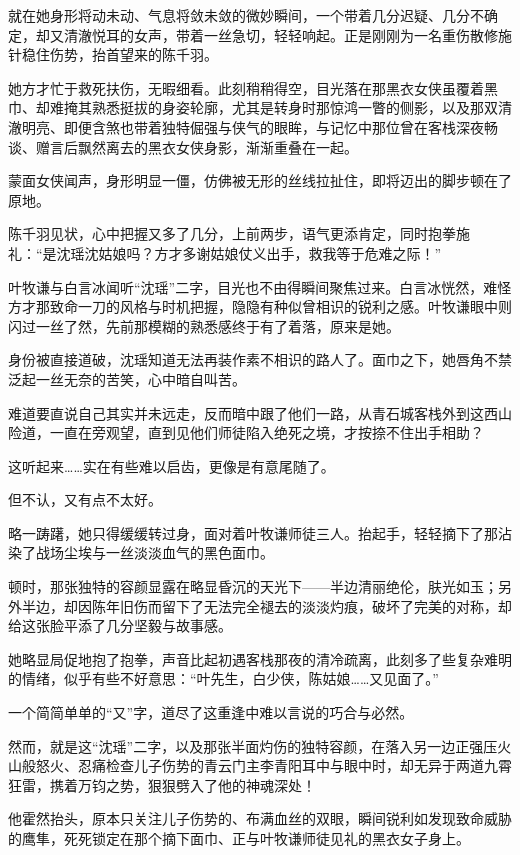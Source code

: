 \vspace{2em}

就在她身形将动未动、气息将敛未敛的微妙瞬间，一个带着几分迟疑、几分不确定，却又清澈悦耳的女声，带着一丝急切，轻轻响起。正是刚刚为一名重伤散修施针稳住伤势，抬首望来的陈千羽。

她方才忙于救死扶伤，无暇细看。此刻稍稍得空，目光落在那黑衣女侠虽覆着黑巾、却难掩其熟悉挺拔的身姿轮廓，尤其是转身时那惊鸿一瞥的侧影，以及那双清澈明亮、即便含煞也带着独特倔强与侠气的眼眸，与记忆中那位曾在客栈深夜畅谈、赠言后飘然离去的黑衣女侠身影，渐渐重叠在一起。

蒙面女侠闻声，身形明显一僵，仿佛被无形的丝线拉扯住，即将迈出的脚步顿在了原地。

陈千羽见状，心中把握又多了几分，上前两步，语气更添肯定，同时抱拳施礼：“是沈瑶沈姑娘吗？方才多谢姑娘仗义出手，救我等于危难之际！”

叶牧谦与白言冰闻听“沈瑶”二字，目光也不由得瞬间聚焦过来。白言冰恍然，难怪方才那致命一刀的风格与时机把握，隐隐有种似曾相识的锐利之感。叶牧谦眼中则闪过一丝了然，先前那模糊的熟悉感终于有了着落，原来是她。

身份被直接道破，沈瑶知道无法再装作素不相识的路人了。面巾之下，她唇角不禁泛起一丝无奈的苦笑，心中暗自叫苦。

难道要直说自己其实并未远走，反而暗中跟了他们一路，从青石城客栈外到这西山险道，一直在旁观望，直到见他们师徒陷入绝死之境，才按捺不住出手相助？

这听起来……实在有些难以启齿，更像是有意尾随了。

但不认，又有点不太好。

略一踌躇，她只得缓缓转过身，面对着叶牧谦师徒三人。抬起手，轻轻摘下了那沾染了战场尘埃与一丝淡淡血气的黑色面巾。

顿时，那张独特的容颜显露在略显昏沉的天光下——半边清丽绝伦，肤光如玉；另外半边，却因陈年旧伤而留下了无法完全褪去的淡淡灼痕，破坏了完美的对称，却给这张脸平添了几分坚毅与故事感。

她略显局促地抱了抱拳，声音比起初遇客栈那夜的清冷疏离，此刻多了些复杂难明的情绪，似乎有些不好意思：“叶先生，白少侠，陈姑娘……又见面了。”

一个简简单单的“又”字，道尽了这重逢中难以言说的巧合与必然。

然而，就是这“沈瑶”二字，以及那张半面灼伤的独特容颜，在落入另一边正强压火山般怒火、忍痛检查儿子伤势的青云门主李青阳耳中与眼中时，却无异于两道九霄狂雷，携着万钧之势，狠狠劈入了他的神魂深处！

他霍然抬头，原本只关注儿子伤势的、布满血丝的双眼，瞬间锐利如发现致命威胁的鹰隼，死死锁定在那个摘下面巾、正与叶牧谦师徒见礼的黑衣女子身上。

